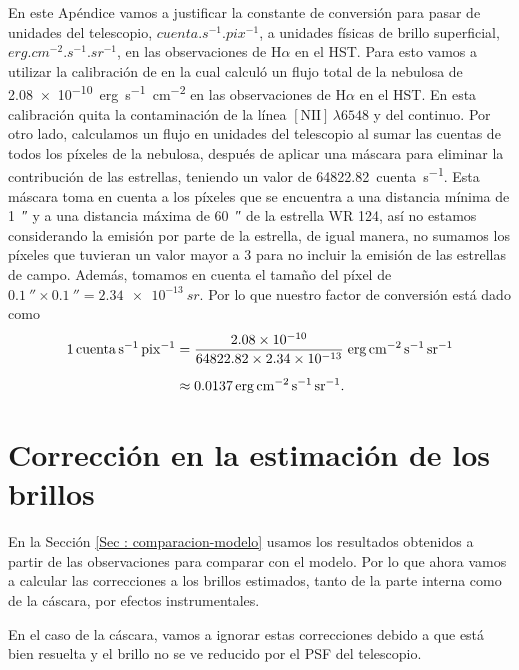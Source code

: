 \documentclass{book}
\begin{document}
En este Apéndice vamos a justificar la constante de conversión para pasar de unidades del telescopio, $\unit{cuenta.s^{-1}.pix^{-1}}$, a unidades físicas de brillo superficial, $\unit{erg.cm^{-2}.s^{-1}.sr^{-1}}$, en las observaciones de H$\alpha$ en el HST. Para esto vamos a utilizar la calibración de \cite{Grosdidier:1998} en la cual calculó un flujo total de la nebulosa de \SI{2.08e-10}{erg.s^{-1}.cm^{-2}} en las observaciones de H$\alpha$ en el HST. En esta calibración quita la contaminación de la línea $[\mathrm{N\scriptstyle{II}}]\,\lambda6548$ y del continuo.
Por otro lado, calculamos un flujo en unidades del telescopio al sumar las cuentas de todos los píxeles de la nebulosa, después de aplicar una máscara para eliminar la contribución de las estrellas, teniendo un valor de \SI{64822.82}{cuenta.s^{-1}}. Esta máscara toma en cuenta a los píxeles que se encuentra a una distancia mínima de \SI{1}{\arcsecond} y a una distancia máxima de \SI{60}{\arcsecond} de la estrella WR 124, así no estamos considerando la emisión por parte de la estrella, de igual manera, no sumamos los píxeles que tuvieran un valor mayor a 3 para no incluir la emisión de las estrellas de campo. Además, tomamos en cuenta el tamaño del píxel de $\SI{0.1}{\arcsecond} \times \SI{0.1}{\arcsecond} 
= \SI{2.34e-13}{sr}$. Por lo que nuestro factor de conversión está dado como
\begin{align}
    \nonumber
    \SI{1}{cuenta.s^{-1}.pix^{-1}}
    & =
    \frac{\num{2.08e-10}}{64822.82 \times \num{2.34e-13}} \;
    \unit{erg.cm^{-2}.s^{-1}.sr^{-1}} \\[\medskipamount]
    & \approx \SI{0.0137}{erg.cm^{-2}.s^{-1}.sr^{-1}}.
\end{align}




\chapter{Corrección en la estimación de los brillos}\label{App:brillos}

En la Sección \ref{Sec : comparacion-modelo} usamos los resultados obtenidos a partir de las observaciones para comparar con el modelo. Por lo que ahora vamos a calcular las correcciones a los brillos estimados, tanto de la parte interna como de la cáscara, por efectos instrumentales.

En el caso de la cáscara, vamos a ignorar estas correcciones debido a que está bien resuelta y  el brillo no se ve reducido por el PSF del telescopio.
\end{document}
